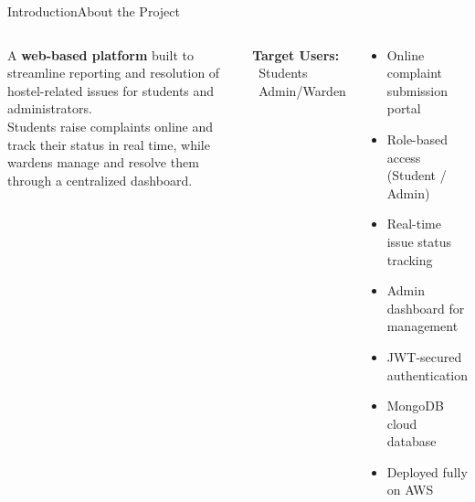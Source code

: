 \documentclass[aspectratio=169]{beamer}
\begin{document}
\begin{frame}{Introduction}{About the Project}
  \begin{columns}[t]
    \begin{tcolorbox}[infobox, title={\color{white}\small\bfseries What is HostelPulse?},
        colbacktitle=NavyBlue]
      {\small A \textbf{web-based platform} built to streamline
      reporting and resolution of hostel-related issues for
      students and administrators.\\[5pt]
      Students raise complaints online and track their status
      in real time, while wardens manage and resolve them
      through a centralized dashboard.}
    \end{tcolorbox}
    \vspace{0.25cm}
    \begin{tcolorbox}[accentbox]
      {\small\textbf{Target Users:}\quad
      {\color{TealPrimary}\faUserGraduate}\ Students \quad
      {\color{NavyBlue}\faUserShield}\ Admin/Warden}
    \end{tcolorbox}

    \begin{tcolorbox}[featurebox, title={\color{white}\small\bfseries Key Highlights},
        colbacktitle=TealPrimary]
      \begin{itemize}\setlength\itemsep{0.25em}
        \item[\color{AccentCyan}\faCheckCircle] Online complaint submission portal
        \item[\color{AccentCyan}\faCheckCircle] Role-based access (Student / Admin)
        \item[\color{AccentCyan}\faCheckCircle] Real-time issue status tracking
        \item[\color{AccentCyan}\faCheckCircle] Admin dashboard for management
        \item[\color{AccentCyan}\faCheckCircle] JWT-secured authentication
        \item[\color{AccentCyan}\faCheckCircle] MongoDB cloud database
        \item[\color{AccentCyan}\faCheckCircle] Deployed fully on AWS
      \end{itemize}
    \end{tcolorbox}
  \end{columns}
\end{frame}
\end{document}
